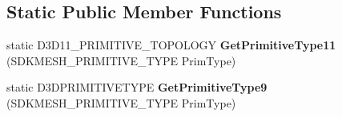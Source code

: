 \subsection*{Static Public Member Functions}
\begin{DoxyCompactItemize}
\item 
\hypertarget{class_c_d_x_u_t_s_d_k_mesh_a5e7810cb02221d374365b6a805af257d}{static D3\+D11\+\_\+\+P\+R\+I\+M\+I\+T\+I\+V\+E\+\_\+\+T\+O\+P\+O\+L\+O\+G\+Y {\bfseries Get\+Primitive\+Type11} (S\+D\+K\+M\+E\+S\+H\+\_\+\+P\+R\+I\+M\+I\+T\+I\+V\+E\+\_\+\+T\+Y\+P\+E Prim\+Type)}\label{class_c_d_x_u_t_s_d_k_mesh_a5e7810cb02221d374365b6a805af257d}

\item 
\hypertarget{class_c_d_x_u_t_s_d_k_mesh_aacb74a2804efae822ea8804e0b9df312}{static D3\+D\+P\+R\+I\+M\+I\+T\+I\+V\+E\+T\+Y\+P\+E {\bfseries Get\+Primitive\+Type9} (S\+D\+K\+M\+E\+S\+H\+\_\+\+P\+R\+I\+M\+I\+T\+I\+V\+E\+\_\+\+T\+Y\+P\+E Prim\+Type)}\label{class_c_d_x_u_t_s_d_k_mesh_aacb74a2804efae822ea8804e0b9df312}

\end{DoxyCompactItemize}
